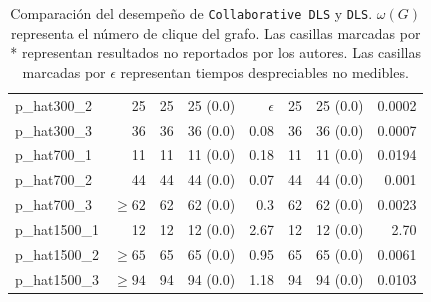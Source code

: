 \documentclass[conference]{IEEEtran}
\begin{document}
\begin{center}
\begin{table}[ht]
{\begin{tabular}{lr|rlr|rlr}
 p\_hat300\_2      &           25  &    25  &  25 (0.0)           &   $\epsilon$  &    25  &  25 (0.0)        &      0.0002  \\
 p\_hat300\_3      &           36  &    36  &  36 (0.0)           &         0.08  &    36  &  36 (0.0)        &      0.0007  \\
 p\_hat700\_1      &           11  &    11  &  11 (0.0)           &         0.18  &    11  &  11 (0.0)        &      0.0194  \\
 p\_hat700\_2      &           44  &    44  &  44 (0.0)           &         0.07  &    44  &  44 (0.0)        &       0.001  \\
 p\_hat700\_3      &    $\geq 62$  &    62  &  62 (0.0)           &          0.3  &    62  &  62 (0.0)        &      0.0023  \\
 p\_hat1500\_1     &           12  &    12  &  12 (0.0)           &         2.67  &    12  &  12 (0.0)        &        2.70  \\
 p\_hat1500\_2     &    $\geq 65$  &    65  &  65 (0.0)           &         0.95  &    65  &  65 (0.0)        &      0.0061  \\
 p\_hat1500\_3     &    $\geq 94$  &    94  &  94 (0.0)           &         1.18  &    94  &  94 (0.0)        &      0.0103  \\
\hline
\end{tabular}}
\hfill{}
\caption{Comparación del desempeño de \texttt{Collaborative DLS} y
  \texttt{DLS}. $\omega(G)$ representa el número de
  clique del grafo. Las casillas marcadas por * representan resultados
no reportados por los autores. Las casillas marcadas por $\epsilon$
representan tiempos despreciables no medibles.}
\label{tb:dls}
\end{table}
\end{center}
\end{document}
